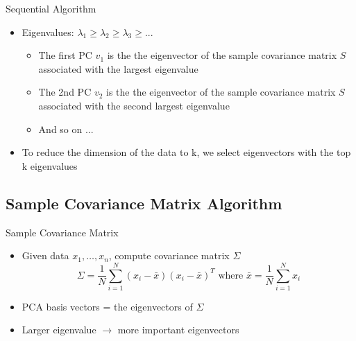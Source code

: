 \documentclass[serif, aspectratio=169]{beamer}
\begin{document}
\begin{frame}{Sequential Algorithm}
    \begin{itemize}
       \item Eigenvalues: $\lambda_1 \geq \lambda_2 \geq \lambda_3 \geq ... $
        \begin{itemize}
            \item The first PC $v_1$ is the the eigenvector of the sample covariance matrix $S$ associated with the largest eigenvalue
            \item The 2nd PC $v_2$ is the the eigenvector of the sample covariance
matrix $S$ associated with the second largest eigenvalue
            \item And so on ...
        \end{itemize}
         \item To reduce the dimension of the data to k, we select eigenvectors with the top k eigenvalues
        
    \end{itemize}
\end{frame}


\subsection{Sample Covariance Matrix Algorithm}

\begin{frame}{Sample Covariance Matrix}
    \begin{itemize}
        \item Given data ${x_1, …, x_n}$, compute covariance matrix $\Sigma$
        $$\Sigma = \frac{1}{N} \sum_{i=1}^{N} (x_i - \bar{x})(x_i - \bar{x})^T \text{ where }  \bar{x} = \frac{1}{N} \sum_{i=1}^{N} x_i $$
        \item PCA basis vectors = the eigenvectors of $\Sigma$
        \item Larger eigenvalue $\rightarrow$ more important eigenvectors
    \end{itemize}
\end{frame}
\end{document}

